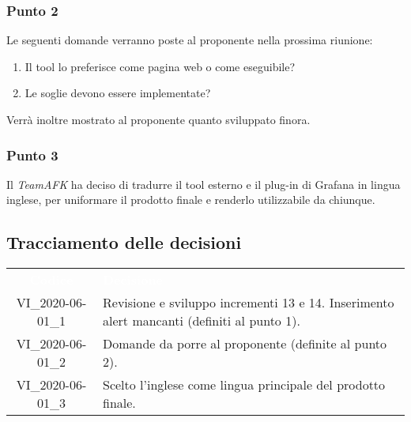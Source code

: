 \subsubsection{Punto 2}
Le seguenti domande verranno poste al proponente nella prossima riunione: \begin{enumerate}
\item Il tool lo preferisce come pagina web o come eseguibile?
\item Le soglie devono essere implementate? 
\end{enumerate}
Verrà inoltre mostrato al proponente quanto sviluppato finora.

\subsubsection{Punto 3}
Il \textit{TeamAFK} ha deciso di tradurre il tool esterno e il plug-in di Grafana in lingua inglese, per uniformare il prodotto finale e renderlo utilizzabile da chiunque.

\subsection{Tracciamento delle decisioni}
\begin{longtable}{ c C{12cm} }
\textcolor{white}{\textbf{Codice}} & \textcolor{white}{\textbf{Decisione}}\\	
		VI\_2020-06-01\_1 & Revisione e sviluppo incrementi 13 e 14. Inserimento alert mancanti (definiti al punto 1).\\
		VI\_2020-06-01\_2 & Domande da porre al proponente (definite al punto 2). \\
		VI\_2020-06-01\_3 & Scelto l'inglese come lingua principale del prodotto finale.
\end{longtable}